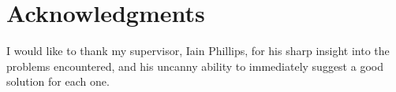 
\chapter{Acknowledgments} %

\label{Acknowledgments} %


I would like to thank my supervisor, Iain Phillips, for his sharp insight into the problems encountered, and his uncanny ability to immediately suggest a good solution for each one.